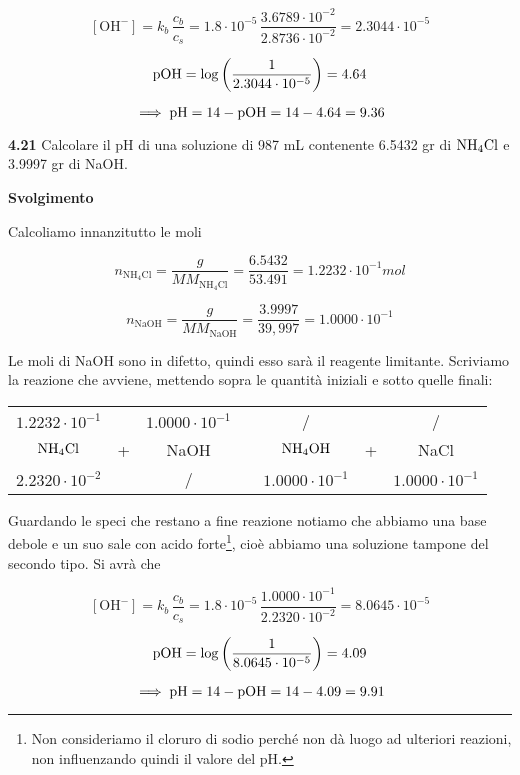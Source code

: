 $$[\text{OH}^-]=k_b\,\frac{c_b}{c_s}
=1.8 \cdot 10^{-5}\,\frac{3.6789 \cdot 10^{-2}}{2.8736 \cdot 10^{-2}}
=2.3044 \cdot 10^{-5}$$

$$\rm pOH=\log \left( \frac{1}{2.3044 \cdot 10^{-5}} \right)=4.64$$

$$\implies \rm pH=14-pOH=14-4.64=9.36$$

\vspace{0.2cm}\textbf{4.21} Calcolare il pH di una soluzione di 987 mL contenente 6.5432 gr di $\rm NH_4Cl$ e 3.9997 gr di NaOH.

\vspace{0.2cm}\large\textbf{Svolgimento}\normalsize

\vspace{0.2cm}Calcoliamo innanzitutto le moli

$$n_{\text{NH}_4\text{Cl}}=\frac{g}{MM_{\text{NH}_4\text{Cl}}}=\frac{6.5432}{53.491}=1.2232 \cdot 10^{-1} mol$$

$$n_{\text{NaOH}}=\frac{g}{MM_{\text{NaOH}}}=\frac{3.9997}{39,997}=1.0000 \cdot 10^{-1}$$

Le moli di NaOH sono in difetto, quindi esso sarà il reagente limitante. Scriviamo la reazione che avviene, mettendo sopra le quantità iniziali e sotto quelle finali:

\begin{center}
    \begin{tabular}{ccccccc}
        $1.2232 \cdot 10^{-1}$ &  & $1.0000 \cdot 10^{-1}$ & & / & & /\\
        $\rm NH_4Cl$ & + & NaOH & \ce{->} & $\rm NH_4OH$ & + & NaCl\\
        $2.2320 \cdot 10^{-2}$ &  & / & & $1.0000 \cdot 10^{-1}$ & &$1.0000 \cdot 10^{-1}$\\
    \end{tabular}
\end{center}

Guardando le speci che restano a fine reazione notiamo che abbiamo una base debole e un suo sale con acido forte\footnote{Non consideriamo il cloruro di sodio perché non dà luogo ad ulteriori reazioni, non influenzando quindi il valore del pH.}, cioè abbiamo una soluzione tampone del secondo tipo. Si avrà che

$$[\text{OH}^-]=k_b\,\frac{c_b}{c_s}
=1.8 \cdot 10^{-5}\,\frac{1.0000 \cdot 10^{-1}}{2.2320 \cdot 10^{-2}}
=8.0645 \cdot 10^{-5}$$

$$\rm pOH=\log \left( \frac{1}{8.0645 \cdot 10^{-5}} \right)=4.09$$

$$\implies \rm pH=14-pOH=14-4.09=9.91$$

